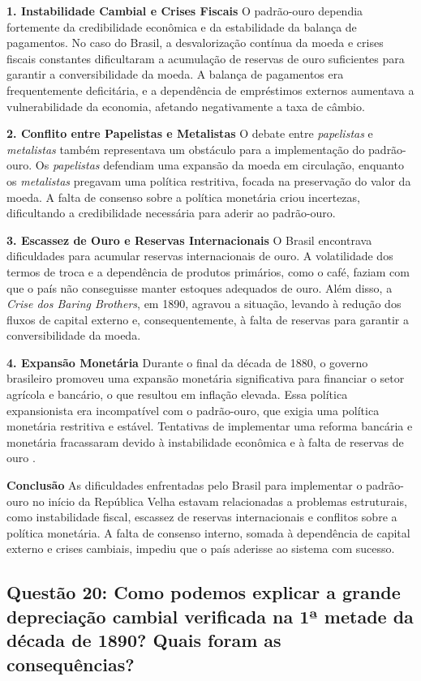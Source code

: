 \documentclass[a4paper,12pt]{article}[abntex2]
\begin{document}
\textbf{1. Instabilidade Cambial e Crises Fiscais}
O padrão-ouro dependia fortemente da credibilidade econômica e da estabilidade da balança de pagamentos. No caso do Brasil, a desvalorização contínua da moeda e crises fiscais constantes dificultaram a acumulação de reservas de ouro suficientes para garantir a conversibilidade da moeda. A balança de pagamentos era frequentemente deficitária, e a dependência de empréstimos externos aumentava a vulnerabilidade da economia, afetando negativamente a taxa de câmbio.

\textbf{2. Conflito entre Papelistas e Metalistas}
O debate entre \textit{papelistas} e \textit{metalistas} também representava um obstáculo para a implementação do padrão-ouro. Os \textit{papelistas} defendiam uma expansão da moeda em circulação, enquanto os \textit{metalistas} pregavam uma política restritiva, focada na preservação do valor da moeda. A falta de consenso sobre a política monetária criou incertezas, dificultando a credibilidade necessária para aderir ao padrão-ouro.

\textbf{3. Escassez de Ouro e Reservas Internacionais}
O Brasil encontrava dificuldades para acumular reservas internacionais de ouro. A volatilidade dos termos de troca e a dependência de produtos primários, como o café, faziam com que o país não conseguisse manter estoques adequados de ouro. Além disso, a \textit{Crise dos Baring Brothers}, em 1890, agravou a situação, levando à redução dos fluxos de capital externo e, consequentemente, à falta de reservas para garantir a conversibilidade da moeda.

\textbf{4. Expansão Monetária}
Durante o final da década de 1880, o governo brasileiro promoveu uma expansão monetária significativa para financiar o setor agrícola e bancário, o que resultou em inflação elevada. Essa política expansionista era incompatível com o padrão-ouro, que exigia uma política monetária restritiva e estável. Tentativas de implementar uma reforma bancária e monetária fracassaram devido à instabilidade econômica e à falta de reservas de ouro .

\textbf{Conclusão}
As dificuldades enfrentadas pelo Brasil para implementar o padrão-ouro no início da República Velha estavam relacionadas a problemas estruturais, como instabilidade fiscal, escassez de reservas internacionais e conflitos sobre a política monetária. A falta de consenso interno, somada à dependência de capital externo e crises cambiais, impediu que o país aderisse ao sistema com sucesso.

\subsection{\textbf{Questão 20: Como podemos explicar a grande depreciação cambial verificada na 1ª metade da década de 1890? Quais foram as consequências?}}
\end{document}
